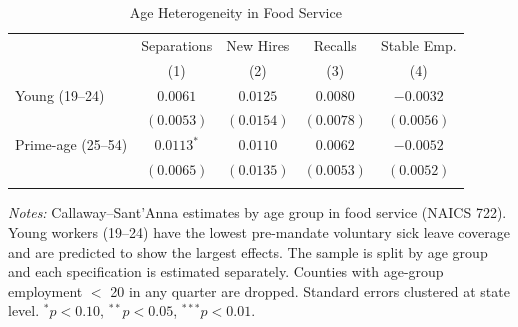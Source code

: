\begin{table}[t]
\centering
\begin{threeparttable}
\caption{Age Heterogeneity in Food Service}
\label{tab:age}
\small
\begin{tabular}{lcccc}
\hline\hline
 & Separations & New Hires & Recalls & Stable Emp. \\
 & (1) & (2) & (3) & (4) \\
\hline
\addlinespace
Young (19--24) & $0.0061$ & $0.0125$ & $0.0080$ & $-0.0032$ \\
 & $(0.0053)$ & $(0.0154)$ & $(0.0078)$ & $(0.0056)$ \\
\addlinespace
Prime-age (25--54) & $0.0113^{*}$ & $0.0110$ & $0.0062$ & $-0.0052$ \\
 & $(0.0065)$ & $(0.0135)$ & $(0.0053)$ & $(0.0052)$ \\
\addlinespace
\hline\hline
\end{tabular}
\begin{tablenotes}[flushleft]
\footnotesize
\item \textit{Notes:} Callaway--Sant'Anna estimates by age group in food service (NAICS 722). Young workers (19--24) have the lowest pre-mandate voluntary sick leave coverage and are predicted to show the largest effects. The sample is split by age group and each specification is estimated separately. Counties with age-group employment $<$ 20 in any quarter are dropped. Standard errors clustered at state level. $^{*}p<0.10$, $^{**}p<0.05$, $^{***}p<0.01$.
\end{tablenotes}
\end{threeparttable}
\end{table}


